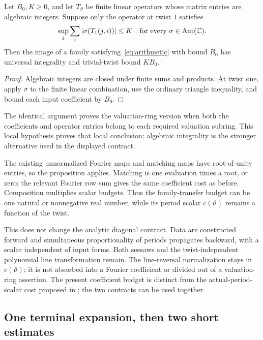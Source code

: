 \begin{proposition}\label{prop:operator}
Let $B_0,K\geq0$, and let $T_\vartheta$ be finite linear operators whose matrix entries are algebraic integers. Suppose only the operator at twist $1$ satisfies
\[
 \sup_j\sum_i|\sigma(T_1(j,i))|\leq K
 \quad\text{for every }\sigma\in\operatorname{Aut}(\mathbb C).
\]
Then the image of a family satisfying~\eqref{eq:arithmetic} with bound $B_0$ has universal integrality and trivial-twist bound $KB_0$.
\end{proposition}
\begin{proof}
Algebraic integers are closed under finite sums and products. At twist one, apply $\sigma$ to the finite linear combination, use the ordinary triangle inequality, and bound each input coefficient by $B_0$.
\end{proof}

The identical argument proves the valuation-ring version when both the coefficients and operator entries belong to each required valuation subring. This local hypothesis proves that local conclusion; algebraic integrality is the stronger alternative used in the displayed contract.

The existing unnormalized Fourier maps and matching maps have root-of-unity entries, so the proposition applies. Matching is one evaluation times a root, or zero; the relevant Fourier row sum gives the same coefficient cost as before. Composition multiplies scalar budgets. Thus the family-transfer budget can be one natural or nonnegative real number, while its period scalar $c(\vartheta)$ remains a function of the twist.

This does not change the analytic diagonal contract. Data are constructed forward and simultaneous proportionality of periods propagates backward, with a scalar independent of input forms. Both seesaws and the twist-independent polynomial line transformation remain. The line-reversal normalization stays in $c(\vartheta)$; it is not absorbed into a Fourier coefficient or divided out of a valuation-ring assertion. The present coefficient budget is distinct from the actual-period-scalar cost proposed in ; the two contracts can be used together.

\subsection{One terminal expansion, then two short estimates}

